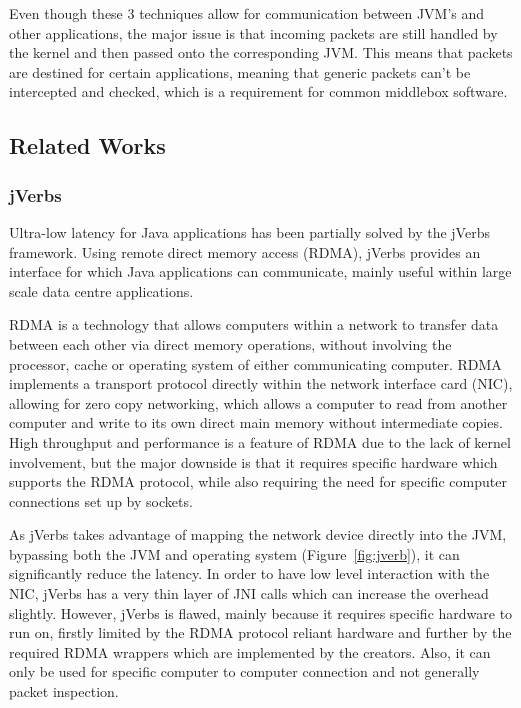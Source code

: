 \documentclass[final_report.tex]{subfiles}
\begin{document}
Even though these 3 techniques allow for communication between JVM's and other applications, the major issue is that incoming packets are still handled by the kernel and then passed onto the corresponding JVM. This means that packets are destined for certain applications, meaning that generic packets can't be intercepted and checked, which is a requirement for common middlebox software.

\subsection{Related Works}

\subsubsection{jVerbs}
Ultra-low latency for Java applications has been partially solved by the jVerbs \cite{jverbs} framework. Using remote direct memory access (RDMA), jVerbs provides an interface for which Java applications can communicate, mainly useful within large scale data centre applications.

RDMA is a technology that allows computers within a network to transfer data between each other via direct memory operations, without involving the processor, cache or operating system of either communicating computer. RDMA implements a transport protocol directly within the network interface card (NIC), allowing for zero copy networking, which allows a computer to read from another computer and write to its own direct main memory without intermediate copies. High throughput and performance is a feature of RDMA due to the lack of kernel involvement, but the major downside is that it requires specific hardware which supports the RDMA protocol, while also requiring the need for specific computer connections set up by sockets.

As jVerbs takes advantage of mapping the network device directly into the JVM, bypassing both the JVM and operating system (Figure~\ref{fig:jverb}), it can significantly reduce the latency. In order to have low level interaction with the NIC, jVerbs has a very thin layer of JNI calls which can increase the overhead slightly. However, jVerbs is flawed, mainly because it requires specific hardware to run on, firstly limited by the RDMA protocol reliant hardware and further by the required RDMA wrappers which are implemented by the creators. Also, it can only be used for specific computer to computer connection and not generally packet inspection. 
\end{document}
